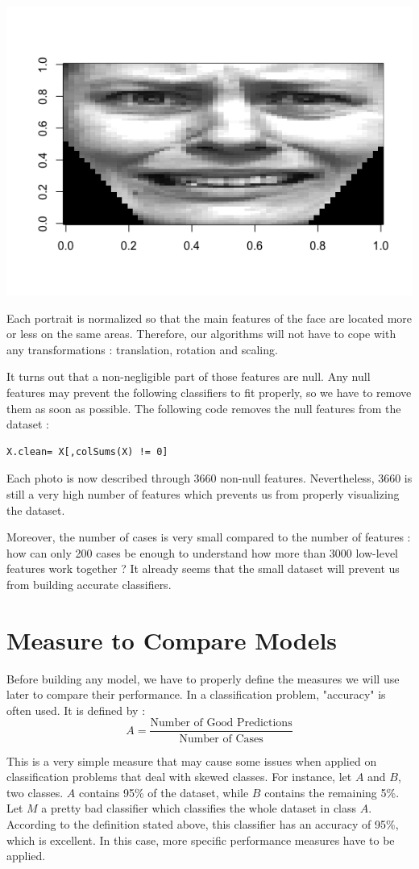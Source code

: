 \documentclass[]{report}
\begin{document}
\begin{center}
	\includegraphics[width=0.6\linewidth]{Figures/sad_X204_y6.png}
	\label{fig:y=6}
\end{center}

Each portrait is normalized so that the main features of the face are located more or less on the same areas. Therefore, our algorithms will not have to cope with any transformations : translation, rotation and scaling.

It turns out that a non-negligible part of those features are null. Any null features may prevent the following classifiers to fit properly, so we have to remove them as soon as possible. The following code removes the null features from the dataset :
\begin{lstlisting}
X.clean= X[,colSums(X) != 0]
\end{lstlisting}
Each photo is now described through 3660 non-null features. Nevertheless, 3660 is still a very high number of features which prevents us from properly visualizing the dataset. 

Moreover, the number of cases is very small compared to the number of features : how can only 200 cases be enough to understand how more than 3000 low-level features work together ? It already seems that the small dataset will prevent us from building accurate classifiers.

\section{Measure to Compare Models}
Before building any model, we have to properly define the measures we will use later to compare their performance. In a classification problem, "accuracy" is often used. It is defined by :
$$
A = \frac{\text{Number of Good Predictions}}{\text{Number of Cases}}
$$

This is a very simple measure that may cause some issues when applied on classification problems that deal with skewed classes. For instance, let $A$ and $B$, two classes. $A$ contains 95\% of the dataset, while $B$ contains the remaining 5\%. Let $M$ a pretty bad classifier which classifies the whole dataset in class $A$. According to the definition stated above, this classifier has an accuracy of 95\%, which is excellent. In this case, more specific performance measures have to be applied.
\end{document}
